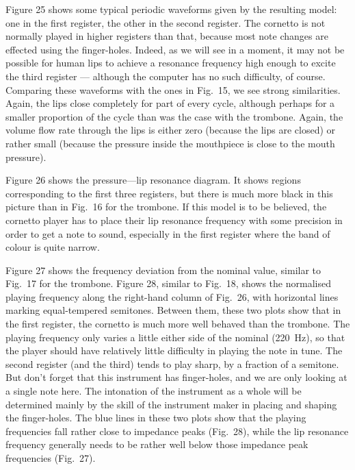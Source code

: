   Figure 25 shows some typical periodic waveforms given by the resulting model: 
  one in the first register, the other in the second register. The cornetto is 
  not normally played in higher registers than that, because most note changes 
  are effected using the finger-holes. Indeed, as we will see in a moment, it 
  may not be possible for human lips to achieve a resonance frequency high 
  enough to excite the third register — although the computer has no such 
  difficulty, of course. Comparing these waveforms with the ones in Fig.\ 15, 
  we see strong similarities. Again, the lips close completely for part of 
  every cycle, although perhaps for a smaller proportion of the cycle than was 
  the case with the trombone. Again, the volume flow rate through the lips is 
  either zero (because the lips are closed) or rather small (because the 
  pressure inside the mouthpiece is close to the mouth pressure). 

  Figure 26 shows the pressure—lip resonance diagram. It shows regions 
  corresponding to the first three registers, but there is much more black in 
  this picture than in Fig.\ 16 for the trombone. If this model is to be 
  believed, the cornetto player has to place their lip resonance frequency with 
  some precision in order to get a note to sound, especially in the first 
  register where the band of colour is quite narrow. 


  Figure 27 shows the frequency deviation from the nominal value, similar to 
  Fig.\ 17 for the trombone. Figure 28, similar to Fig.\ 18, shows the 
  normalised playing frequency along the right-hand column of Fig.\ 26, with 
  horizontal lines marking equal-tempered semitones. Between them, these two 
  plots show that in the first register, the cornetto is much more well behaved 
  than the trombone. The playing frequency only varies a little either side of 
  the nominal (220~Hz), so that the player should have relatively little 
  difficulty in playing the note in tune. The second register (and the third) 
  tends to play sharp, by a fraction of a semitone. But don’t forget that this 
  instrument has finger-holes, and we are only looking at a single note here. 
  The intonation of the instrument as a whole will be determined mainly by the 
  skill of the instrument maker in placing and shaping the finger-holes. The 
  blue lines in these two plots show that the playing frequencies fall rather 
  close to impedance peaks (Fig.\ 28), while the lip resonance frequency 
  generally needs to be rather well below those impedance peak frequencies 
  (Fig.\ 27). 

